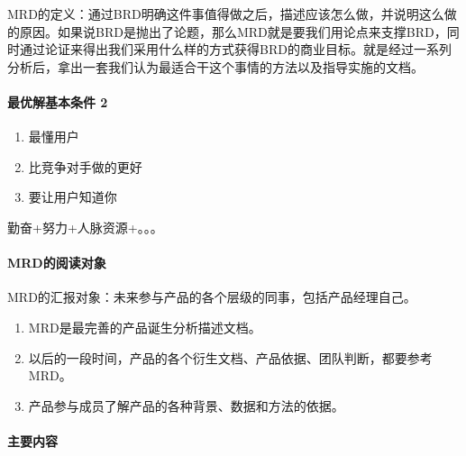 \documentclass[letterpaper,11pt,english]{sphinxmanual}
\begin{document}
MRD的定义：通过BRD明确这件事值得做之后，描述应该怎么做，并说明这么做的原因。如果说BRD是抛出了论题，那么MRD就是要我们用论点来支撑BRD，同时通过论证来得出我们采用什么样的方式获得BRD的商业目标。就是经过一系列分析后，拿出一套我们认为最适合干这个事情的方法以及指导实施的文档。


\paragraph{最优解基本条件 2\sphinxfootnotemark[178]}
\label{\detokenize{chapter_skill/MRD:id2}}%
\begin{footnotetext}[178]\sphinxAtStartFootnote
{}
%
\end{footnotetext}\ignorespaces \begin{enumerate}
%
\item {} 
最懂用户

\item {} 
比竞争对手做的更好

\item {} 
要让用户知道你

\end{enumerate}

勤奋+努力+人脉资源+。。。


\paragraph{MRD的阅读对象}
\label{\detokenize{chapter_skill/MRD:mrd}}
MRD的汇报对象：未来参与产品的各个层级的同事，包括产品经理自己。
\begin{enumerate}
%
\item {} 
MRD是最完善的产品诞生分析描述文档。

\item {} 
以后的一段时间，产品的各个衍生文档、产品依据、团队判断，都要参考MRD。

\item {} 
产品参与成员了解产品的各种背景、数据和方法的依据。

\end{enumerate}


\paragraph{主要内容}
\label{\detokenize{chapter_skill/MRD:id3}}
\end{document}
